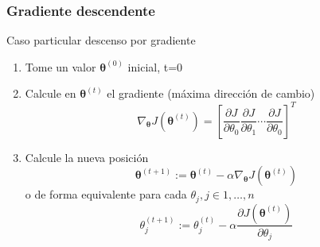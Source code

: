 \documentclass[spanish]{beamer}
\begin{document}
\begin{frame}
\frametitle{Gradiente descendente}
Caso particular descenso por gradiente 
\begin{enumerate}
\item Tome un valor $\boldsymbol{\theta}^{(0)}$ inicial, t=0
\item Calcule en   $\boldsymbol{\theta}^{(t)}$ el gradiente (máxima dirección de cambio)
\begin{equation*}
\nabla_{\boldsymbol{\theta}}  J(\boldsymbol{\theta}^{(t)})= \left[ \frac{\partial J}{\partial \theta_{0}}  \frac{\partial J}{\partial \theta_{1}}  \cdots \frac{\partial J}{\partial \theta_{0}} \right]^{T} 
\end{equation*}
\item Calcule la nueva posición 
\begin{equation*}
{\boldsymbol{\theta}}^{(t+1)}:= {\boldsymbol{\theta}}^{(t)}- \alpha \nabla_{\boldsymbol{\theta}}  J(\boldsymbol{\theta}^{(t)})
\end{equation*}
o de forma equivalente para cada $\theta_{j}, j\in 1, \ldots ,n$
\begin{equation*}
\theta_{j}^{(t+1)}:=\theta_{j}^{(t)}- \alpha \frac{\partial J({\boldsymbol{\theta}}^{(t)})}{\partial \theta_j}
\end{equation*}
\end{enumerate}    
    
\end{frame}
\end{document}
